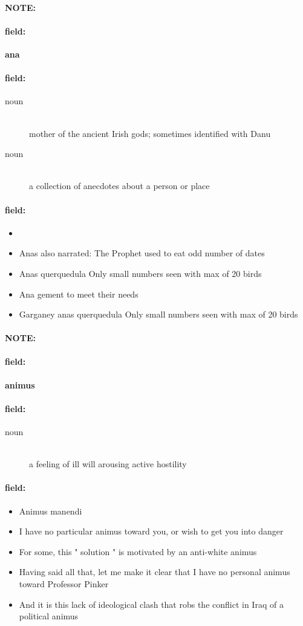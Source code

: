 \documentclass[12pt]{article}
\newenvironment{note}{\paragraph{NOTE:}}{}
\newenvironment{field}{\paragraph{field:}}{}
\begin{document}
\begin{note}
\begin{field}
\textbf{\large ana}
\end{field}


\begin{field}
\begin{description}
\item[noun] \hfill \\ 
mother of the ancient Irish gods; sometimes identified with Danu

\item[noun] \hfill \\ 
a collection of anecdotes about a person or place

\end{description}
\end{field}

\begin{field}
\begin{itemize}
\item 
\item Anas also narrated: The Prophet used to eat odd number of dates
\item Anas querquedula Only small numbers seen with max of 20 birds
\item Ana gement to meet their needs
\item Garganey anas querquedula Only small numbers seen with max of 20 birds
\end{itemize}
\end{field}
\end{note}
\begin{note}
\begin{field}
\textbf{\large animus}
\end{field}


\begin{field}
\begin{description}
\item[noun] \hfill \\ 
a feeling of ill will arousing active hostility

\end{description}
\end{field}

\begin{field}
\begin{itemize}
\item Animus manendi
\item I have no particular animus toward you, or wish to get you into danger
\item For some, this " solution " is motivated by an anti-white animus
\item Having said all that, let me make it clear that I have no personal animus toward Professor Pinker
\item And it is this lack of ideological clash that robs the conflict in Iraq of a political animus
\end{itemize}
\end{field}
\end{note}
\end{document}
